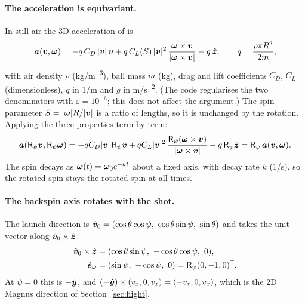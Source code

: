 \paragraph{The acceleration is equivariant.}
In still air the 3D acceleration of  is
\begin{equation}
  \bm{a}(\bm{v},\bm{\omega}) = -q\,C_D\,|\bm{v}|\,\bm{v}
  + q\,C_L(S)\,|\bm{v}|^2\,\frac{\bm{\omega}\times\bm{v}}{|\bm{\omega}\times\bm{v}|} - g\,\hat{\bm{z}},
  \qquad q=\frac{\rho\pi R^2}{2m},
  \label{eq:robust_spec-acc3d}
\end{equation}
with air density $\rho$ (\unit{kg/m\textsuperscript{3}}), ball mass $m$ (\unit{kg}), drag and lift coefficients
$C_D$, $C_L$ (dimensionless), $q$ in \unit{1/m} and $g$ in \unit{m/s\textsuperscript{2}}.
(The code regularises the two denominators with $\varepsilon=10^{-6}$\assumed; this does not affect the
argument.)
The spin parameter $S=|\bm{\omega}|R/|\bm{v}|$ is a ratio of lengths, so it is unchanged by the
rotation.
Applying the three properties term by term:
\begin{equation}
  \bm{a}(\mathsf R_\psi\bm{v},\mathsf R_\psi\bm{\omega})
  = -qC_D|\bm{v}|\,\mathsf R_\psi\bm{v}
  + qC_L|\bm{v}|^2\,\frac{\mathsf R_\psi(\bm{\omega}\times\bm{v})}{|\bm{\omega}\times\bm{v}|}
  - g\,\mathsf R_\psi\hat{\bm{z}}
  = \mathsf R_\psi\,\bm{a}(\bm{v},\bm{\omega}).
  \label{eq:robust_spec-equiv}
\end{equation}
The spin decays as $\bm{\omega}(t)=\bm{\omega}_0e^{-kt}$ about a fixed axis, with decay rate
$k$ (\unit{1/s}), so the rotated spin stays the rotated spin at all times.

\paragraph{The backspin axis rotates with the shot.}
The launch direction is $\hat{\bm{v}}_0 = (\cos\theta\cos\psi,\ \cos\theta\sin\psi,\ \sin\theta)$ and
 takes the unit vector along $\hat{\bm{v}}_0\times\hat{\bm{z}}$:
\begin{equation}
  \begin{split}
  \hat{\vect v}_0\times\hat{\vect z} &= (\cos\theta\sin\psi,\ -\cos\theta\cos\psi,\ 0),\\
  \hat{\vect e}_\omega &= (\sin\psi,\ -\cos\psi,\ 0) = \mathsf R_\psi(0,-1,0)^{\mathsf T}.
  \end{split}
  \label{eq:robust_spec-axis}
\end{equation}
At $\psi=0$ this is $-\hat{\bm{y}}$, and $(-\hat{\bm{y}})\times(v_x,0,v_z)=(-v_z,0,v_x)$, which is
the 2D Magnus direction of Section~\ref{sec:flight}.

